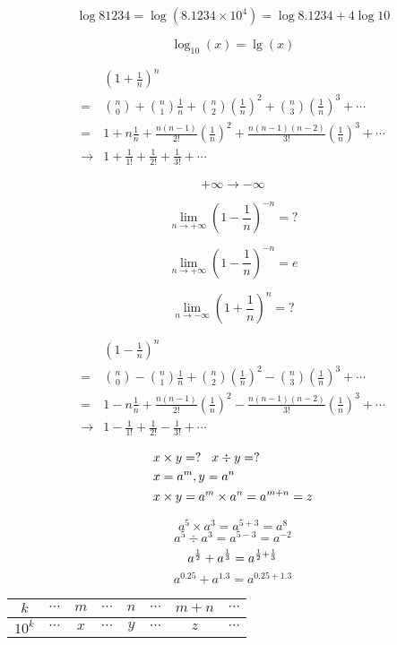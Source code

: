 $$  \log81234  =  \log(8.1234 \times 10^4)  =   \log8.1234 + 4 \log10 $$

$$ \log_{10}(x) = \lg (x) $$ 

\begin{align*}
 & (1+\frac 1 n ) ^n  \\
 =  & \binom{n}{0}  + \binom{n}{1}  \frac 1 n + \binom{n}{2} (\frac 1 n)^2 + \binom{n}{3} (\frac 1 n)^3 + \cdots  \\
 =  & 1 + n \frac 1 n + \frac {n(n-1)}{2!}  (\frac 1 n)^2  +  \frac {n(n-1)(n-2)}{3!}  (\frac 1 n)^3 + \cdots  \\
 \rightarrow  & 1 + \frac{1}{1!}  + \frac{1}{2!}   + \frac{1}{3!}  + \cdots
 \end{align*}  


$$  +\infty   \rightarrow   -\infty  $$ 

$$  \lim_{n\rightarrow + \infty } (1-\frac 1 n ) ^{-n}    =  ?  $$

$$  \lim_{n\rightarrow + \infty } (1-\frac 1 n ) ^{-n}    =  e  $$


$$  \lim_{n\rightarrow - \infty } (1+ \frac 1 n ) ^{n}    =  ?  $$



\begin{align*}
 & (1-\frac 1 n ) ^n  \\
 =  & \binom{n}{0}  - \binom{n}{1}  \frac 1 n + \binom{n}{2} (\frac 1 n)^2 - \binom{n}{3} (\frac 1 n)^3 + \cdots  \\
 =  & 1 - n \frac 1 n + \frac {n(n-1)}{2!}  (\frac 1 n)^2  -  \frac {n(n-1)(n-2)}{3!}  (\frac 1 n)^3 + \cdots  \\
 \rightarrow  & 1 -\frac{1}{1!}  + \frac{1}{2!}   - \frac{1}{3!}  + \cdots
 \end{align*}  


\begin{align*}
& x  \times   y  = ? \hspace{0.3cm}  x  \div  y  = ? \\
& x  =  a^m ,     y =  a^n   \\
& x  \times  y  =  a^{m}   \times  a^{n}  = a^{m+n} = z
\end{align*}

$$  a^5 \times a^3 = a^{5+3} = a^8  $$   
$$   a^5  \div a^3 = a^{5-3} = a^{-2} $$
$$ a^{1\over2} + a^{1\over 3} = a^{\frac 1 2 + \frac 1 3} $$
$$  a^{0.25}  +  a^{1.3}  =   a^{0.25 + 1.3}  $$

\begin{tabular}{c|ccccccc}
\hline
$k$  & $\cdots$ & $m$ & $\cdots$ & $n$ & $\cdots$ & $m+n$ & $\cdots$ \\
\hline
$10^k$  & $\cdots$ &  $x$  & $\cdots$ & $y$ & $\cdots$ & $z$ & $\cdots$ \\
\hline
\end{tabular}


